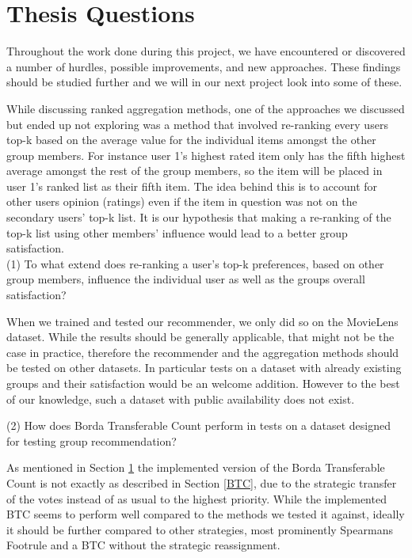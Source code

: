 \section{Thesis Questions}
Throughout the work done during this project, we have encountered or discovered a number of hurdles, possible improvements, and new approaches. These findings should be studied further and we will in our next project look into some of these.

While discussing ranked aggregation methods, one of the approaches we discussed but ended up not exploring was a method that involved re-ranking every users top-k based on the average value for the individual items amongst the other group members. For instance user 1's highest rated item only has the fifth highest average amongst the rest of the group members, so the item will be placed in user 1's ranked list as their fifth item. The idea behind this is to account for other users opinion (ratings) even if the item in question was not on the secondary users' top-k list. It is our hypothesis that making a re-ranking of the top-k list using other members' influence would lead to a better group satisfaction.\\

(1) To what extend does re-ranking a user's top-k preferences, based on other group members, influence the individual user as well as the groups overall satisfaction?

When we trained and tested our recommender, we only did so on the MovieLens dataset. While the results should be generally applicable, that might not be the case in practice, therefore the recommender and the aggregation methods should be tested on other datasets. In particular tests on a dataset with already existing groups and their satisfaction would be an welcome addition. However to the best of our knowledge, such a dataset with public availability does not exist. 

(2) How does Borda Transferable Count perform in tests on a dataset designed for testing group recommendation?

As mentioned in Section \ref{}  the implemented version of the Borda Transferable Count is not exactly as described in Section \ref{BTC}, due to the strategic transfer of the votes instead of as usual to the highest priority. While the implemented BTC seems to perform well compared to the methods we tested it against, ideally it should be further compared to other strategies, most prominently Spearmans Footrule and a BTC without the strategic reassignment.

